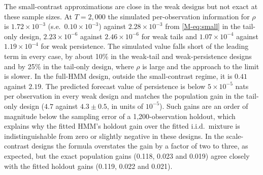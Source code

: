 \documentclass[11pt,a4paper]{article}
\theoremstyle{plain}
\theoremstyle{remark}
\begin{document}
The small-contrast approximations are close in the weak designs but not exact at these sample sizes. At $T=2{,}000$ the simulated per-observation information for $\rho$ is $1.72\times10^{-3}$ (s.e.\ $0.10\times10^{-3}$) against $2.28\times10^{-3}$ from \eqref{M-eq:small} in the tail-only design, $2.23\times10^{-6}$ against $2.46\times10^{-6}$ for weak tails and $1.07\times10^{-4}$ against $1.19\times10^{-4}$ for weak persistence. The simulated value falls short of the leading term in every case, by about 10\% in the weak-tail and weak-persistence designs and by 25\% in the tail-only design, where $\rho$ is large and the approach to the limit is slower. In the full-HMM design, outside the small-contrast regime, it is $0.41$ against $2.19$. The predicted forecast value of persistence is below $5\times10^{-5}$ nats per observation in every weak design and matches the population gain in the tail-only design ($4.7$ against $4.3\pm0.5$, in units of $10^{-5}$). Such gains are an order of magnitude below the sampling error of a 1{,}200-observation holdout, which explains why the fitted HMM's holdout gain over the fitted i.i.d.\ mixture is indistinguishable from zero or slightly negative in these designs. In the scale-contrast designs the formula overstates the gain by a factor of two to three, as expected, but the exact population gains (0.118, 0.023 and 0.019) agree closely with the fitted holdout gains (0.119, 0.022 and 0.021).
\end{document}
